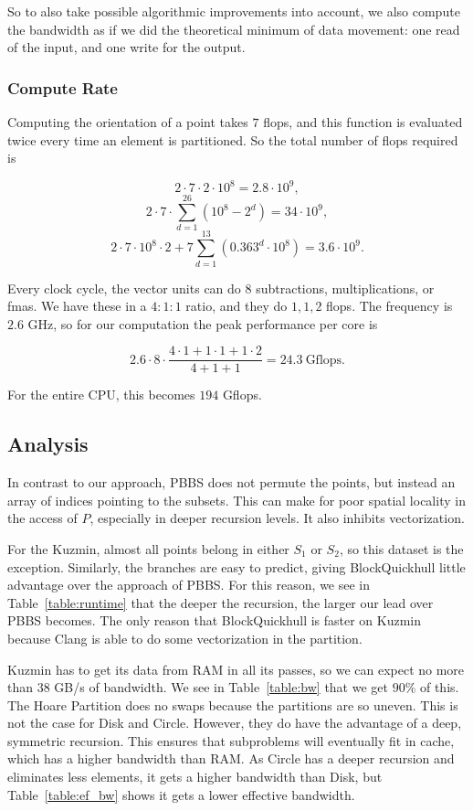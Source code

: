 So to also take possible algorithmic improvements into account,
we also compute the bandwidth as if we did the theoretical minimum of
data movement: one read of the input, and one write for the output.

\subsubsection{Compute Rate}

Computing the orientation of a point takes $7$ flops, and this function is
evaluated twice every time an element is partitioned. So the total number of
flops required is

$$2 \cdot 7 \cdot 2 \cdot 10^8 = 2.8 \cdot 10^9,$$ 
$$2 \cdot 7 \cdot \sum_{d = 1}^{26} (10^8 - 2^d) = 34 \cdot 10^9,$$
$$2 \cdot 7 \cdot 10^8 \cdot 2 + 7 \sum_{d = 1}^{13} \left(0.363^d \cdot 
10^8 \right)  = 3.6 \cdot 10^9.$$

Every clock cycle, the vector units can do $8$ subtractions, multiplications, 
or fmas. We have these in a $4:1:1$ ratio, and they do $1, 1, 2$
flops. The frequency is $2.6$ GHz, so for our computation the peak performance
per core is

$$2.6 \cdot 8 \cdot \frac{4 \cdot 1 + 1 \cdot 1 + 1 \cdot 2}{4 + 1 + 1} = 24.3 
        \ \text{Gflops}.$$

For the entire CPU, this becomes $194$ Gflops.

\subsection{Analysis}

In contrast to our approach, PBBS does not permute the points, but instead
an array of indices pointing to the subsets. This can make for poor spatial
locality in the access of $P$, especially in deeper recursion levels.
It also inhibits vectorization.

For the Kuzmin, almost all points belong in either $S_1$ or $S_2$, so
this dataset is the exception. Similarly, the branches are easy to predict,
giving BlockQuickhull little advantage over the approach of
PBBS. For this reason, we see in Table~\ref{table:runtime} that the deeper
the recursion, the larger our lead over PBBS becomes. The only reason that
BlockQuickhull is faster on Kuzmin because Clang is able to do some 
vectorization in the partition.

Kuzmin has to get its data from RAM in all its passes, so we can expect
no more than $38$ GB/s of bandwidth. We see in Table~\ref{table:bw} that
we get $90\%$ of this. The Hoare Partition does no swaps because the
partitions are so uneven. This is not the case for Disk and Circle. However, 
they do have the advantage of a deep, symmetric recursion. This ensures
that subproblems will eventually fit in cache, which has a higher bandwidth
than RAM. As Circle has a deeper recursion and eliminates less elements,
it gets a higher bandwidth than Disk, but Table~\ref{table:ef_bw} shows it
gets a lower effective bandwidth.

